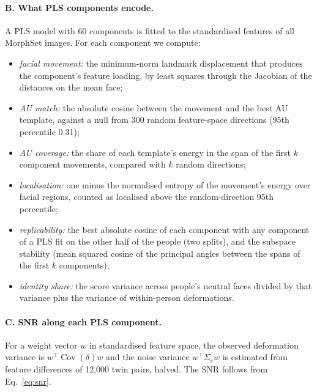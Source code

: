 \documentclass[11pt,a4paper]{article}
\newcommand{\Cov}{\operatorname{Cov}}
\begin{document}
\paragraph{B. What PLS components encode.} A PLS model with 60 components is fitted to the
standardised features of all MorphSet images. For each component we compute:
\begin{itemize}
  \item \emph{facial movement:} the minimum-norm landmark displacement that produces the
  component's feature loading, by least squares through the Jacobian of the distances on the mean
  face;
  \item \emph{AU match:} the absolute cosine between the movement and the best AU template, against
  a null from 300 random feature-space directions (95th percentile 0.31);
  \item \emph{AU coverage:} the share of each template's energy in the span of the first $k$
  component movements, compared with $k$ random directions;
  \item \emph{localisation:} one minus the normalised entropy of the movement's energy over facial
  regions, counted as localised above the random-direction 95th percentile;
  \item \emph{replicability:} the best absolute cosine of each component with any component of a
  PLS fit on the other half of the people (two splits), and the subspace stability (mean squared
  cosine of the principal angles between the spans of the first $k$ components);
  \item \emph{identity share:} the score variance across people's neutral faces divided by that
  variance plus the variance of within-person deformations.
\end{itemize}

\paragraph{C. SNR along each PLS component.} For a weight vector $w$ in standardised feature space,
the observed deformation variance is $w^\top\Cov(\delta)w$ and the noise variance $w^\top\Sigma_e w$
is estimated from feature differences of 12,000 twin pairs, halved. The SNR follows from
Eq.~\eqref{eq:snr}.
\end{document}
